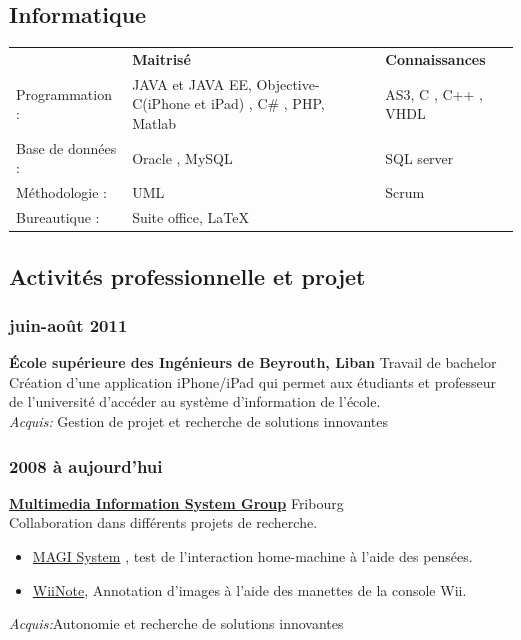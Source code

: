 \documentclass[12pt,a4paper,twoside]{report}
\begin{document}
\subsection{Informatique}
\vspace{-0.4cm}
\begin{tabular}[t]{lp{5.5cm}l}
 & \textbf{Maitrisé} & \textbf{Connaissances} \\
 Programmation : &  JAVA et JAVA EE, Objective-C(iPhone et iPad) , C\# , PHP, Matlab &  AS3,   C , C++ , VHDL\\ 
 Base de données : &  Oracle , MySQL&  SQL server \\
Méthodologie : & UML & Scrum \\
Bureautique : & Suite office, \LaTeX & \\
\end{tabular}

\subsection{Activités professionnelle et projet  }
\vspace{-0.4cm}
\subsubsection{juin-août 2011}
\vspace{-0.4cm}
\textbf{École supérieure des Ingénieurs de Beyrouth, Liban }Travail de bachelor \\
Création d'une application iPhone/iPad qui permet aux étudiants et professeur de l'université  d'accéder au système d'information de l'école.\\
\textit{Acquis:} Gestion de projet et recherche de solutions innovantes
\vspace{-0.2cm}
\subsubsection{2008 à aujourd'hui}
\vspace{-0.4cm}
\textbf{\href{http://www.misg.ch/}{Multimedia  Information System Group} }Fribourg\\
Collaboration dans différents projets de recherche.
\begin{itemize}
\item \href{http://magisystem.project.eia-fr.ch/}{MAGI System} , test de l'interaction home-machine à l'aide des pensées.
\item \href{http://portal.acm.org/citation.cfm?id=1647363}{WiiNote}, Annotation d'images à l'aide des manettes de la console Wii. 
\end{itemize}
\textit{Acquis:}Autonomie et recherche de solutions innovantes
\vspace{-0.2cm}
\end{document}
